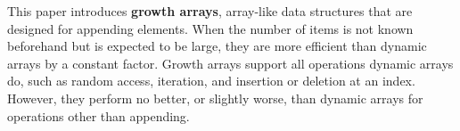 This paper introduces \textbf{growth arrays}, array-like data structures that are designed for appending elements. When the number of items is not known beforehand but is expected to be large, they are more efficient than dynamic arrays by a constant factor. Growth arrays support all operations dynamic arrays do, such as random access, iteration, and insertion or deletion at an index. However, they perform no better, or slightly worse, than dynamic arrays for operations other than appending.
